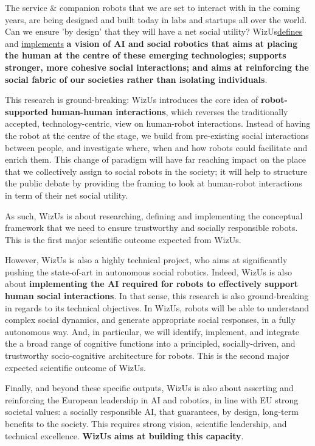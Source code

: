 \documentclass[11pt,a4paper]{report}
\newcommand{\project}{WizUs\xspace}
\begin{document}
The service \& companion robots that we are set to interact with in the coming
years, are being designed and built today in labs and startups all over the
world. Can we ensure 'by design' that they will have a net social utility?
\project \underline{defines} and \underline{implements} \textbf{a vision of AI
and social robotics that aims at placing the human at the centre of these
emerging technologies; supports stronger, more cohesive social interactions;
and aims at reinforcing the social fabric of our societies rather than isolating
individuals}.

This research is ground-breaking: \project introduces the core idea of
\textbf{robot-supported human-human interactions}, which reverses the
traditionally accepted, technology-centric, view on human-robot interactions.
Instead of having the robot at the centre of the stage, we build from
pre-existing social interactions between people, and investigate where, when and
how robots could facilitate and enrich them. This change of paradigm will have
far reaching impact on the place that we collectively assign to social robots in
the society; it will help to structure the public debate by providing the
framing to look at human-robot interactions in term of their net social utility.

As such, \project is about researching, defining and implementing the conceptual
framework that we need to ensure trustworthy and socially responsible robots.
This is the first major scientific outcome expected from \project.

However, \project is also a highly technical project, who aims at significantly
pushing the state-of-art in autonomous social robotics. Indeed, \project is also
about \textbf{implementing the AI required for robots to effectively support
human social interactions}.  In that sense, this research is also
ground-breaking in regards to its technical objectives. In \project, robots will
be able to understand complex social dynamics, and generate appropriate social
responses, in a fully autonomous way.  And, in particular, we will identify,
implement, and integrate the a broad range of cognitive functions into a
principled, socially-driven, and trustworthy socio-cognitive architecture for
robots. This is the second major expected scientific outcome of \project.

Finally, and beyond these specific outputs, \project is also about asserting and
reinforcing the European leadership in AI and robotics, in line with EU strong
societal values: a socially responsible AI, that guarantees, by design,
long-term benefits to the society. This requires strong vision, scientific
leadership, and technical excellence. \textbf{\project aims at building this
capacity}. 
\end{document}
